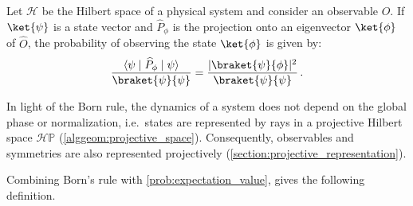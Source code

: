     \begin{axiom}\label{qm:born_rule}
        Let $\mathcal{H}$ be the Hilbert space of a physical system and consider an observable $\widehat{O}$. If $\ket{\psi}$ is a state vector and $\widehat{P}_\phi$ is the projection onto an eigenvector $\ket{\phi}$ of $\widehat{O}$, the probability of observing the state $\ket{\phi}$ is given by:
        \begin{gather}
            \frac{\langle\psi\mid\widehat{P}_\phi\mid\psi\rangle}{\braket{\psi}{\psi}} = \frac{|\braket{\psi}{\phi}|^2}{\braket{\psi}{\psi}}\,.
        \end{gather}
    \end{axiom}

    \begin{property}[Projectivization]\label{qm:projectivization}
        In light of the Born rule, the dynamics of a system does not depend on the global phase or normalization, i.e.~states are represented by rays in a projective Hilbert space $\mathcal{H}\mathbb{P}$ (\cref{alggeom:projective_space}). Consequently, observables and symmetries are also represented projectively (\cref{section:projective_representation}).
    \end{property}

    Combining Born's rule with \cref{prob:expectation_value}, gives the following definition.

